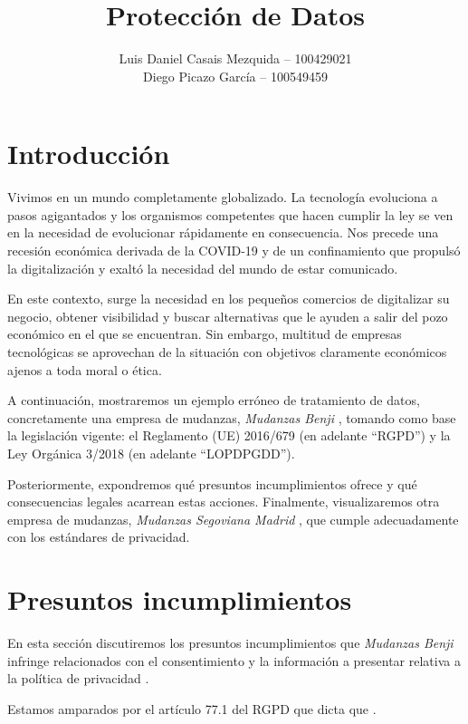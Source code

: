 \documentclass[es]{uc3mreport}
\author{
    Luis Daniel Casais Mezquida -- 100429021\\
    Diego Picazo García -- 100549459
}
\title{Protección de Datos}
\begin{document}
    \makecover


    \begin{report}

        \section{Introducción}
        Vivimos en un mundo completamente globalizado. La tecnología evoluciona a pasos agigantados y los organismos competentes que hacen cumplir la ley se ven en la necesidad de evolucionar rápidamente en consecuencia. Nos precede una recesión económica derivada de la COVID-19 y de un confinamiento que propulsó la digitalización y exaltó la necesidad del mundo de estar comunicado.

        En este contexto, surge la necesidad en los pequeños comercios de digitalizar su negocio, obtener visibilidad y buscar alternativas que le ayuden a salir del pozo económico en el que se encuentran. Sin embargo, multitud de empresas tecnológicas se aprovechan de la situación con objetivos claramente económicos ajenos a toda moral o ética.

        A continuación, mostraremos un ejemplo erróneo de tratamiento de datos, concretamente una empresa de mudanzas, \textit{Mudanzas Benji} \cite{benji}, tomando como base la legislación vigente: el Reglamento (UE) 2016/679 \cite{RGPD} (en adelante ``RGPD'') y la Ley Orgánica 3/2018 \cite{LOPDPGDD} (en adelante ``LOPDPGDD'').

        Posteriormente, expondremos qué presuntos incumplimientos ofrece y qué consecuencias legales acarrean estas acciones. Finalmente, visualizaremos otra empresa de mudanzas, \textit{Mudanzas Segoviana Madrid} \cite{alcorcon}, que cumple adecuadamente con los estándares de privacidad.



        \section{Presuntos incumplimientos}
        En esta sección discutiremos los presuntos incumplimientos que \textit{Mudanzas Benji} infringe relacionados con el consentimiento y la información a presentar relativa a la política de privacidad .

        Estamos amparados por el artículo 77.1 del RGPD que dicta que .



\end{report}
\end{document}
